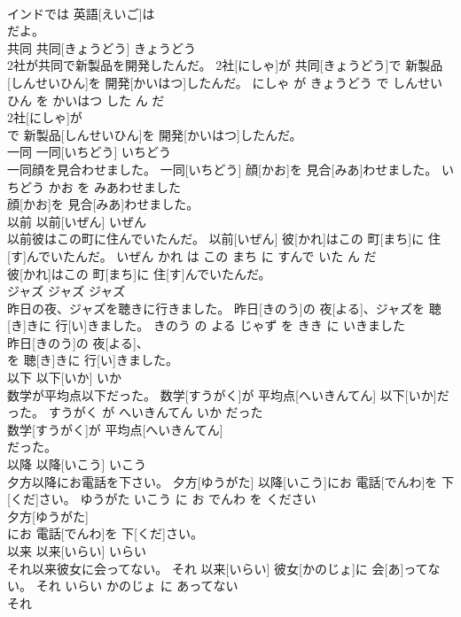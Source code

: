 \documentclass[8pt]{extreport}
\begin{document}
\begin{CJK}{UTF8}{min}
\\	インドでは 英語[えいご]は
\\	だよ。			
\\	共同	共同[きょうどう]	きょうどう	
\\	2社が共同で新製品を開発したんだ。	2社[にしゃ]が 共同[きょうどう]で 新製品[しんせいひん]を 開発[かいはつ]したんだ。	にしゃ が きょうどう で しんせいひん を かいはつ した ん だ	
\\	2社[にしゃ]が
\\	で 新製品[しんせいひん]を 開発[かいはつ]したんだ。			
\\	一同	一同[いちどう]	いちどう	
\\	一同顔を見合わせました。	一同[いちどう] 顔[かお]を 見合[みあ]わせました。	いちどう かお を みあわせました	
\\	顔[かお]を 見合[みあ]わせました。			
\\	以前	以前[いぜん]	いぜん	
\\	以前彼はこの町に住んでいたんだ。	以前[いぜん] 彼[かれ]はこの 町[まち]に 住[す]んでいたんだ。	いぜん かれ は この まち に すんで いた ん だ	
\\	彼[かれ]はこの 町[まち]に 住[す]んでいたんだ。			
\\	ジャズ	ジャズ	ジャズ	
\\	昨日の夜、ジャズを聴きに行きました。	昨日[きのう]の 夜[よる]、ジャズを 聴[き]きに 行[い]きました。	きのう の よる じゃず を きき に いきました	
\\	昨日[きのう]の 夜[よる]、
\\	を 聴[き]きに 行[い]きました。			
\\	以下	以下[いか]	いか	
\\	数学が平均点以下だった。	数学[すうがく]が 平均点[へいきんてん] 以下[いか]だった。	すうがく が へいきんてん いか だった	
\\	数学[すうがく]が 平均点[へいきんてん]
\\	だった。			
\\	以降	以降[いこう]	いこう	
\\	夕方以降にお電話を下さい。	夕方[ゆうがた] 以降[いこう]にお 電話[でんわ]を 下[くだ]さい。	ゆうがた いこう に お でんわ を ください	
\\	夕方[ゆうがた]
\\	にお 電話[でんわ]を 下[くだ]さい。			
\\	以来	以来[いらい]	いらい	
\\	それ以来彼女に会ってない。	それ 以来[いらい] 彼女[かのじょ]に 会[あ]ってない。	それ いらい かのじょ に あってない	
\\	それ

\end{CJK}
\end{document}
